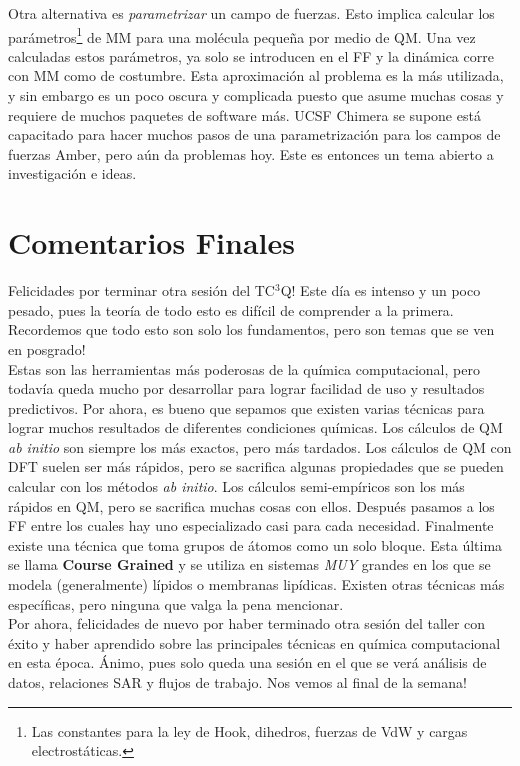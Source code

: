\documentclass[10pt,letterpaper]{article}
\begin{document}
Otra alternativa es \emph{parametrizar} un campo de fuerzas. Esto implica calcular los par\'ametros\footnote{Las constantes para la ley de Hook, dihedros, fuerzas de VdW y cargas electrost\'aticas.} de MM para una mol\'ecula peque\~na por medio de QM. Una vez calculadas estos par\'ametros, ya solo se introducen en el FF y la din\'amica corre con MM como de costumbre. Esta aproximaci\'on al problema es la m\'as utilizada, y sin embargo es un poco oscura y complicada puesto que asume muchas cosas y requiere de muchos paquetes de software m\'as. UCSF Chimera se supone est\'a capacitado para hacer muchos pasos de una parametrizaci\'on para los campos de fuerzas Amber, pero a\'un da problemas hoy. Este es entonces un tema abierto a investigaci\'on e ideas.

\section{Comentarios Finales}
Felicidades por terminar otra sesi\'on del TC$^3$Q! Este d\'ia es intenso y un poco pesado, pues la teor\'ia de todo esto es dif\'icil de comprender a la primera. Recordemos que todo esto son solo los fundamentos, pero son temas que se ven en posgrado!\\

Estas son las herramientas m\'as poderosas de la qu\'imica computacional, pero todav\'ia queda mucho por desarrollar para lograr facilidad de uso y resultados predictivos. Por ahora, es bueno que sepamos que existen varias t\'ecnicas para lograr muchos resultados de diferentes condiciones qu\'imicas. Los c\'alculos de QM \textit{ab initio} son siempre los m\'as exactos, pero m\'as tardados. Los c\'alculos de QM con DFT suelen ser m\'as r\'apidos, pero se sacrifica algunas propiedades que se pueden calcular con los m\'etodos \textit{ab initio}. Los c\'alculos semi-emp\'iricos son los m\'as r\'apidos en QM, pero se sacrifica muchas cosas con ellos. Despu\'es pasamos a los FF entre los cuales hay uno especializado casi para cada necesidad. Finalmente existe una t\'ecnica que toma grupos de \'atomos como un solo bloque. Esta \'ultima se llama \textbf{Course Grained} y se utiliza en sistemas \emph{MUY} grandes en los que se modela (generalmente) l\'ipidos o membranas lip\'idicas. Existen otras t\'ecnicas m\'as espec\'ificas, pero ninguna que valga la pena mencionar.\\

Por ahora, felicidades de nuevo por haber terminado otra sesi\'on del taller con \'exito y haber aprendido sobre las principales t\'ecnicas en qu\'imica computacional en esta \'epoca. \'Animo, pues solo queda una sesi\'on en el que se ver\'a an\'alisis de datos, relaciones SAR y flujos de trabajo. Nos vemos al final de la semana!
\end{document}
